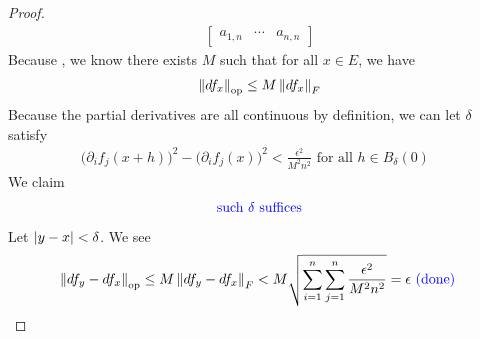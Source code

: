 \documentclass{report}
\begin{document}
\begin{proof}
\begin{align*}
\begin{bmatrix}
  a_{1,n} & \cdots & a_{n,n}  
\end{bmatrix}
\end{align*}
Because , we know there exists $M$ such that for all $x\in E$, we have 
\begin{align*}
\left\| df_x \right\|_\text{op}\leq  M\left\| df_x \right\|_F
\end{align*}
Because the partial derivatives are all continuous by definition, we can let $\delta$ satisfy 
\begin{align*}
  \big(\partial_i f_j(x+h)\big)^2-\big(\partial_i f_j(x)\big)^2< \frac{\epsilon^2 }{M^2n^2}\text{ for all $h \in B_\delta (0)$ }
\end{align*}
We claim 
\begin{align*}
\textcolor{blue}{\text{ such }\delta\text{ suffices }}
\end{align*}
Let $\left|y-x\right|<\delta$. We see 
\begin{align*}
\left\| df_y-df_x \right\|_\text{op}\leq M\left\| df_y -df_x \right\|_F< M \sqrt{\sum_{i=1}^n \sum_{j=1}^n\frac{\epsilon^2 }{M^2n^2}}=\epsilon \textcolor{blue}{\text{ (done) }}
\end{align*}












\end{proof}
\end{document}
